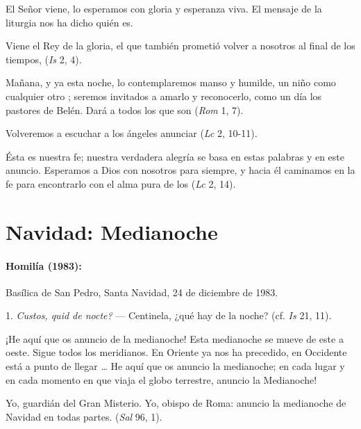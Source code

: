 \begin{body}
\begin{body}
		El Señor viene, lo esperamos con gloria y esperanza viva. El mensaje de la liturgia nos ha dicho quién es.

		Viene el Rey de la gloria, el que también prometió volver a nosotros al final de los tiempos,  (\emph{Is} 2, 4).

		Mañana, y ya esta noche, lo contemplaremos manso y humilde, un niño como cualquier otro ; seremos invitados a amarlo y reconocerlo, como un día los pastores de Belén. Dará  a todos los que son  (\emph{Rom} 1, 7).

		Volveremos a escuchar a los ángeles anunciar  (\emph{Lc} 2, 10-11).

		Ésta es nuestra fe; nuestra verdadera alegría se basa en estas palabras y en este anuncio. Esperamos a Dios con nosotros para siempre, y hacia él caminamos en la fe para encontrarlo con el alma pura de los  (\emph{Lc} 2, 14).
	\end{body}

	\chapter{Navidad: Medianoche}

	\subsubsection{Homilía (1983):}

	Basílica de San Pedro, Santa Navidad, 24 de diciembre de 1983.

	\begin{body}
		1. \emph{Custos, quid de nocte?} --- Centinela, ¿qué hay de la noche? (cf. \emph{Is} 21, 11).

		¡He aquí que os anuncio de la medianoche! Esta medianoche se mueve de este a oeste. Sigue todos los meridianos. En Oriente ya nos ha precedido, en Occidente está a punto de llegar \ldots{} He aquí que os anuncio la medianoche; en cada lugar y en cada momento en que viaja el globo terrestre, anuncio la Medianoche!

		Yo, guardián del Gran Misterio. Yo, obispo de Roma: anuncio la medianoche de Navidad en todas partes.  (\emph{Sal} 96, 1).


\end{body}
\end{body}
